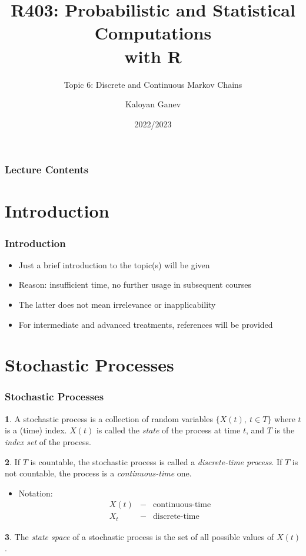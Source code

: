 \documentclass[10pt]{beamer}
\title{R403: Probabilistic and Statistical Computations\\ with R}
\subtitle{Topic 6: \textcolor{myred}{Discrete and Continuous Markov Chains}}
\author{Kaloyan Ganev}
\date{2022/2023}
\theoremstyle{definition}
\newtheorem{definition}{\translate{Definition}}
\begin{document}
\maketitle

\begin{frame}[fragile]
\frametitle{Lecture Contents}
\tableofcontents
\end{frame}

\section{Introduction}
\begin{frame}[fragile]
	\frametitle{Introduction}
	\begin{itemize}
		\item Just a brief introduction to the topic(s) will be given
		
		\item Reason: insufficient time, no further usage in subsequent courses
		
		\item The latter does not mean irrelevance or inapplicability
		
		\item For intermediate and advanced treatments, references will be provided
	\end{itemize}
\end{frame}

\section{Stochastic Processes}
\begin{frame}[fragile]
	\frametitle{Stochastic Processes}
	\begin{definition}
		A stochastic process is a collection of random variables $ \{X(t), \ t \in T\} $ where $ t $ is a (time) index. $ X(t) $ is called the \textit{state} of the process at time $ t $, and $ T $ is the \textit{index set} of the process.
	\end{definition}

	\begin{definition}
		If $ T $ is countable, the stochastic process is called a \textit{discrete-time process}. If $ T $ is not countable, the process is a \textit{continuous-time} one.
	\end{definition}

	\begin{itemize}
		\item Notation:
		\[
		\begin{array}{lcl}
			X(t) & - & \textrm{continuous-time}\\
			X_{t} & - & \textrm{discrete-time}			
		\end{array}
		\]
	\end{itemize}

	\begin{definition}
		The \textit{state space} of a stochastic process is the set of all possible values of $ X(t) $.
	\end{definition}
\end{frame}
\end{document}
